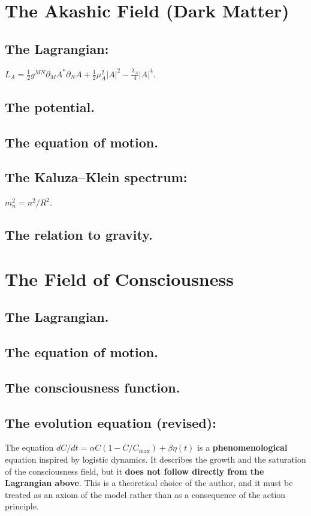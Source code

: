 \documentclass[11pt,a4paper]{article}
\begin{document}
\section{The Akashic Field (Dark Matter)}
\subsection{The Lagrangian:} $L_A = \frac{1}{2} g^{MN} \partial_M A^* \partial_N A + \frac{1}{2} \mu_A^2 |A|^2 - \frac{\lambda_A}{4} |A|^4$.
\subsection{The potential.}
\subsection{The equation of motion.}
\subsection{The Kaluza--Klein spectrum:} $m_n^2 = n^2/R^2$.
\subsection{The relation to gravity.}

\section{The Field of Consciousness}
\subsection{The Lagrangian.}
\subsection{The equation of motion.}
\subsection{The consciousness function.}
\subsection{The evolution equation (revised):} The equation $dC/dt = \alpha C (1 - C/C_{\text{max}}) + \beta \eta(t)$ is a \textbf{phenomenological} equation inspired by logistic dynamics. It describes the growth and the saturation of the consciousness field, but it \textbf{does not follow directly from the Lagrangian above}. This is a theoretical choice of the author, and it must be treated as an axiom of the model rather than as a consequence of the action principle.
\end{document}
